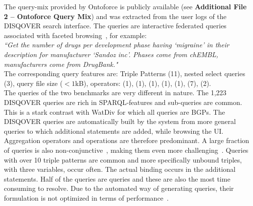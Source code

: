 \documentclass[twocolumn]{bmcart}%
\newcommand{\sql}[1]{\textsc{\scalebox{0.8}{#1}}}
\newcommand\todo[1]{\textcolor{red}{#1}}
\begin{document}

The query-mix provided by Ontoforce is publicly available (see \textbf{Additional File 2 -- Ontoforce Query Mix}) and was extracted from the user logs of the DISQOVER search interface. 
The queries are interactive federated queries associated with faceted browsing~\cite{Ferre, Oren}, for example:\\

\textit{``Get the number of drugs per development phase having `migraine'
	in their description for manufacturer `Sandoz inc'. Phases come
	from chEMBL, \\ manufacturers come from DrugBank."} \\

The corresponding query features are: Triple Patterns (11), nested select queries (3), query file size ($<1$kB), operators: \sql{optional} (1), \sql{group}(1), \sql{order}(1), \sql{count}(1), \sql{union}(1), \sql{filter}(7), \sql{filter in}(2).  \\


The queries of the two benchmarks are very different in nature. 
The 1,223 DISQOVER queries are rich in SPARQL-features and sub-queries are common. This is a stark contrast with WatDiv for which all queries are BGPs.
The DISQOVER queries are automatically built by the system from more general queries to which additional \sql{filter} statements are added, while browsing the UI.
Aggregation operators and \sql{filter} operations are therefore predominant. A large fraction of queries is also non-conjunctive~\cite{conjunctive}, making them even more challenging~\cite{Picalausa2011}.
Queries with over 10 triple patterns are common and more specifically unbound triples, with three variables, occur often. The actual binding occurs in the additional \sql{filter} statements. Half of the queries are \sql{count distinct} queries and these are also the most time consuming to resolve. 
Due to the automated way of generating queries, their formulation is not optimized in terms of performance~\cite{Groth}. 
\end{document}
